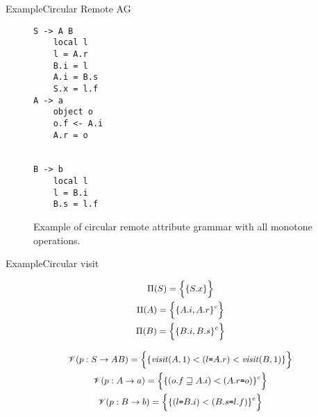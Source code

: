 \begin{frame}[fragile=singleslide]{Example}{Circular Remote AG}


\begin{figure}
    \centering
\begin{multicols}{3}
\begin{Verbatim}[fontsize=\small]
S -> A B
    local l
    l = A.r
    B.i = l
    A.i = B.s
    S.x = l.f
A -> a
    object o
    o.f <- A.i
    A.r = o


B -> b
    local l
    l = B.i
    B.s = l.f
\end{Verbatim}
\end{multicols}
    \caption{Example of circular remote attribute grammar with all monotone operations.}
    \label{fig:crag-definition-with-all-monotone}
\end{figure}

\end{frame}


\begin{frame}{Example}{Circular visit}

\begin{equation}
\small
\begin{gathered}
\Pi(S) =  \Big \{   \{ S.x \}      \Big \} \\
\Pi(A) =  \Big \{   \{  A.i, A.r \}^c      \Big \} \\
\Pi(B) =  \Big \{   \{  B.i, B.s \}^c      \Big \}
\end{gathered}
\end{equation}

\begin{equation}
\small
\begin{gathered}
\mathscr{V}(p: S \rightarrow A B) = \Big \{  \{  \mathit{visit}(A, 1) <  (l \texttt{=} A.r) < \mathit{visit}(B, 1)  \}    \Big \} \\
\mathscr{V}(p: A \rightarrow a) = \Big \{  \{  (o.f \sqsupseteq A.i)  < (A.r \texttt{=} o)  \}^c    \Big \} \\
\mathscr{V}(p: B \rightarrow b) = \Big \{  \{  (l \texttt{=} B.i) < (B.s \texttt{=} l.f)  \}^c    \Big \}
\end{gathered}
\end{equation}


\end{frame}

